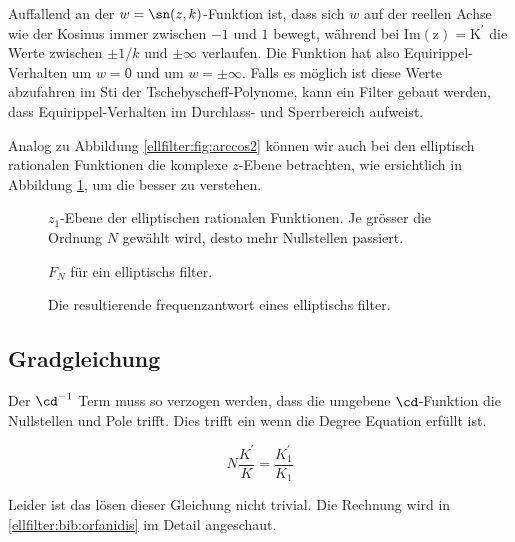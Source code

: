 Auffallend an der $w = \sn(z, k)$-Funktion ist, dass sich $w$ auf der reellen Achse wie der Kosinus immer zwischen $-1$ und $1$ bewegt, während bei $\mathrm{Im(z) = K^\prime}$ die Werte zwischen $\pm 1/k$ und $\pm \infty$ verlaufen.
Die Funktion hat also Equirippel-Verhalten um $w=0$ und um $w=\pm \infty$.
Falls es möglich ist diese Werte abzufahren im Sti der Tschebyscheff-Polynome, kann ein Filter gebaut werden, dass Equirippel-Verhalten im Durchlass- und Sperrbereich aufweist.



Analog zu Abbildung \ref{ellfilter:fig:arccos2} können wir auch bei den elliptisch rationalen Funktionen die komplexe $z$-Ebene betrachten, wie ersichtlich in Abbildung \ref{ellfilter:fig:cd2}, um die besser zu verstehen.
\begin{figure}
    \centering
    
    \caption{
        $z_1$-Ebene der elliptischen rationalen Funktionen.
        Je grösser die Ordnung $N$ gewählt wird, desto mehr Nullstellen passiert.
    }
    \label{ellfilter:fig:cd2}
\end{figure}



\begin{figure}
    \centering
    
    \caption{$F_N$ für ein elliptischs filter.}
    \label{ellfilter:fig:elliptic}
\end{figure}


\begin{figure}
    \centering
    
    \caption{Die resultierende frequenzantwort eines elliptischs filter.}
    \label{ellfilter:fig:elliptic_freq}
\end{figure}

\subsection{Gradgleichung}

Der $\cd^{-1}$ Term muss so verzogen werden, dass die umgebene $\cd$-Funktion die Nullstellen und Pole trifft.
Dies trifft ein wenn die Degree Equation erfüllt ist.

\begin{equation}
    N \frac{K^\prime}{K} = \frac{K^\prime_1}{K_1}
\end{equation}


Leider ist das lösen dieser Gleichung nicht trivial.
Die Rechnung wird in \ref{ellfilter:bib:orfanidis} im Detail angeschaut.

